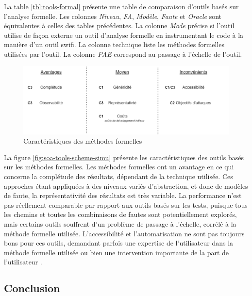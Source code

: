             La table \ref{tbl:tools-formal} présente une table de comparaison d'outils basés sur l'analyse formelle.
            Les colonnes \textit{Niveau}, \textit{FA}, \textit{Modèle}, \textit{Faute} et \textit{Oracle} sont équivalentes à celles des tables précédentes.
            La colonne \textit{Mode} précise si l'outil utilise de façon externe un outil d'analyse formelle en instrumentant le code à la manière d'un outil \gls{swifi}.
            La colonne technique liste les méthodes formelles utilisées par l'outil.
            La colonne \textit{PAE} correspond au passage à l'échelle de l'outil.
            
            \begin{figure}[hbt]\centering
              \includegraphics[scale=.43]{ch2-background/img/advantages-formal.drawio.png}
              \caption{Caractéristiques des méthodes formelles}
              \label{fig:soa-tools-scheme-formal}
            \end{figure}
            
            La figure \ref{fig:soa-tools-scheme-simu} présente les caractéristiques des outils basés sur les méthodes formelles.
            Les méthodes formelles ont un avantage en ce qui concerne la complétude des résultats, dépendant de la technique utilisée. 
            Ces approches étant appliquées à des niveaux variés d'abstraction, et donc de modèles de faute, la représentativité des
            résultats est très variable.
            La performance n'est pas réellement comparable par rapport aux outils basés sur les tests, puisque tous les chemins et toutes les combinaisons de fautes sont potentiellement explorés, mais certains outils souffrent d'un problème de passage à l'échelle, corrélé à la méthode formelle utilisée.
            L'accessibilité et l'automatisation ne sont pas toujours bons pour ces outils, demandant parfois une expertise de l'utilisateur dans la méthode formelle utilisée ou bien une intervention importante de la part de l'utilisateur \cite{Larsson/VERIFY07}.
    
        \subsection{Conclusion}
        \label{sec:soa-tools-conclusion}
            
